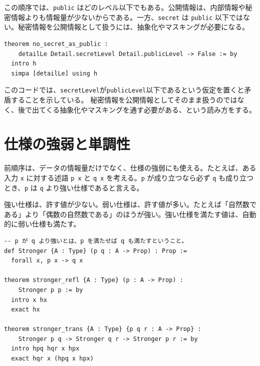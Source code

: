 この順序では、\texttt{public} はどのレベル以下でもある。公開情報は、内部情報や秘密情報よりも情報量が少ないからである。一方、\texttt{secret} は \texttt{public} 以下ではない。秘密情報を公開情報として扱うには、抽象化やマスキングが必要になる。

\begin{listing}[htbp]
\begin{verbatim}
theorem no_secret_as_public :
    detailLe Detail.secretLevel Detail.publicLevel -> False := by
  intro h
  simpa [detailLe] using h
\end{verbatim}
\caption{秘密情報をそのまま公開扱いにできないこと}
\label{lst:ch16-no-downgrade}
\end{listing}

このコードでは、\texttt{secretLevel}が\texttt{publicLevel}以下であるという仮定を置くと矛盾することを示している。
秘密情報を公開情報としてそのまま扱うのではなく、後で出てくる抽象化やマスキングを通す必要がある、という読み方をする。

\section{仕様の強弱と単調性}

前順序は、データの情報量だけでなく、仕様の強弱にも使える。たとえば、ある入力 \texttt{x} に対する述語 \texttt{p x} と \texttt{q x} を考える。\texttt{p} が成り立つなら必ず \texttt{q} も成り立つとき、\texttt{p} は \texttt{q} より強い仕様であると言える。

\begin{intuitionbox}
強い仕様は、許す値が少ない。弱い仕様は、許す値が多い。たとえば「自然数である」より「偶数の自然数である」のほうが強い。強い仕様を満たす値は、自動的に弱い仕様も満たす。
\end{intuitionbox}

\begin{listing}[htbp]
\begin{verbatim}
-- p が q より強いとは、p を満たせば q も満たすということ。
def Stronger {A : Type} (p q : A -> Prop) : Prop :=
  forall x, p x -> q x

theorem stronger_refl {A : Type} (p : A -> Prop) :
    Stronger p p := by
  intro x hx
  exact hx

theorem stronger_trans {A : Type} {p q r : A -> Prop} :
    Stronger p q -> Stronger q r -> Stronger p r := by
  intro hpq hqr x hpx
  exact hqr x (hpq x hpx)
\end{verbatim}
\caption{仕様の強弱を含意で表す}
\label{lst:ch16-stronger-spec}
\end{listing}

